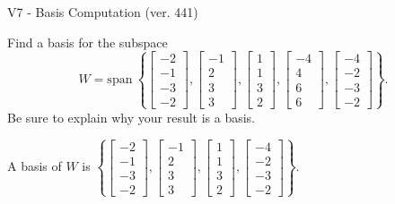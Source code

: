 \begin{exercise}
  \begin{exerciseTitle}V7 - Basis Computation (ver. 441)\end{exerciseTitle}
  \begin{exerciseStatement}
    Find a basis for the subspace 
\[W=\mathrm{span}\ \left\{\left[\begin{array}{r}
-2 \\
-1 \\
-3 \\
-2
\end{array}\right] , \left[\begin{array}{r}
-1 \\
2 \\
3 \\
3
\end{array}\right] , \left[\begin{array}{r}
1 \\
1 \\
3 \\
2
\end{array}\right] , \left[\begin{array}{r}
-4 \\
4 \\
6 \\
6
\end{array}\right] , \left[\begin{array}{r}
-4 \\
-2 \\
-3 \\
-2
\end{array}\right]\right\}.\]
 Be sure to explain why your result is a basis.


  \end{exerciseStatement}
  \begin{exerciseAnswer}
   A basis of \(W\) is  \(\left\{\left[\begin{array}{r}
-2 \\
-1 \\
-3 \\
-2
\end{array}\right] , \left[\begin{array}{r}
-1 \\
2 \\
3 \\
3
\end{array}\right] , \left[\begin{array}{r}
1 \\
1 \\
3 \\
2
\end{array}\right] , \left[\begin{array}{r}
-4 \\
-2 \\
-3 \\
-2
\end{array}\right]\right\}\).
  


  \end{exerciseAnswer}
\end{exercise}